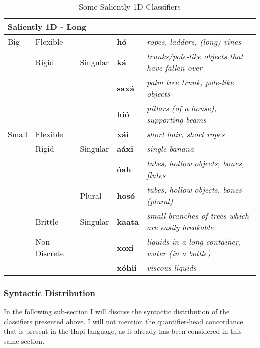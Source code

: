 \documentclass[a4paper, 12pt, oneside]{memoir}
\begin{document}
\begin{table}[H]
    \begin{tabular}{lll>{\bfseries}l>{\itshape}p{5cm}}
        \toprule
        \multicolumn{5}{l}{Saliently 1D - Long} \\
        \midrule
        Big   & Flexible     &          & hó    & ropes, ladders, (long) vines          \\
              & Rigid        & Singular & ká    & trunks/pole-like objects that have fallen over    \\
              &              &          & saxá  & palm tree trunk, pole-like objects                 \\
              &              &          & hió   & pillars (of a house), supporting beams             \\
        \midrule
        Small & Flexible     &          & xái   & short hair, short ropes                            \\
              & Rigid        & Singular & aáxi  & single banana                                      \\
              &              &          & óah   & tubes, hollow objects, bones, flutes              \\
              &              & Plural   & hosó  & tubes, hollow objects, bones (plural)              \\
              & Brittle      & Singular & kaata & small branches of trees which are easily breakable \\
              & Non-Discrete &          & xoxi  & liquids in a long container, water (in a bottle)   \\
              &              &          & xóhii & viscous liquids \\
        \bottomrule
        \end{tabular}
\caption{Some Saliently 1D Classifiers}
\label{tab:longclass}
\end{table}
\subsubsection{Syntactic Distribution}
In the following sub-section I will discuss the syntactic distribution of the classifiers presented above. I will not mention the quantifier-head concordance that is present in the Hapi language, as it already has been considered in this same section.
\end{document}
